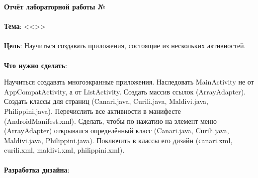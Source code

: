 \documentclass[12pt, a4paper, simple]{eskdtext}
\def \gpiDocTopic {Отчёт лабораторной работы №\gpiDocNum}
\begin{document}
    
    \begin{center}
        \textbf{\gpiDocTopic}
    \end{center}

    \paragraph{} \textbf{Тема}: <<\gpiTopicRep>>

    \paragraph{} \textbf{Цель}: Научиться создавать приложения, состоящие из нескольких активностей.

    \paragraph{} \textbf{Что нужно сделать}:

    Научиться создавать многоэкранные приложения. Наследовать MainActivity не от\\ AppCompatActivity, а от ListActivity.
    Создать массив ссылок (ArrayAdapter). Создать классы для страниц (Canari.java, Curili.java, Maldivi.java, Philippini.java).
    Перечислить все активности в манифесте (AndroidManifest.xml).
    Сделать, чтобы по нажатию на элемент меню (ArrayAdapter) открывался определённый класс (Canari.java, Curili.java, Maldivi.java, Philippini.java).
    Поключить в классы его дизайн (сanari.xml, curili.xml, maldivi.xml, philippini.xml).



    \paragraph{} \textbf{Разработка дизайна}:
\end{document}
